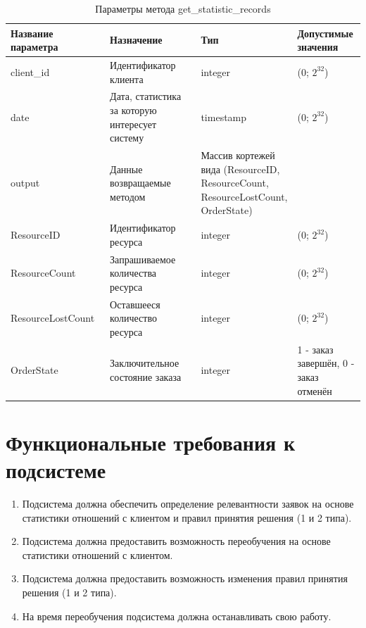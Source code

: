 \documentclass[utf8x, 12pt]{G7-32}
\begin{document}
\begin{table}[ht!]
        \caption{Параметры метода get_statistic_records}
        \begin{center}
                \begin{tabular}{|p{0.3\linewidth}|p{0.3\linewidth}|p{0.2\linewidth}|p{0.2\linewidth}|}
                        \hline
                        \textbf{Название параметра} & \textbf{Назначение} &\textbf{Тип} & \textbf{Допустимые значения}\\
                        \hline
                        client_id & Идентификатор клиента & integer & (0; $2^{32}$) \\
                        \hline   
                        date & Дата, статистика за которую интересует систему & timestamp & (0; $2^{32}$) \\
                        \hline   
                        output & Данные возвращаемые методом & Массив кортежей вида (ResourceID, ResourceCount, ResourceLostCount, OrderState)&  \\
                        \hline   
                        ResourceID & Идентификатор ресурса & integer & (0; $2^{32}$) \\
                        \hline
                        ResourceCount & Запрашиваемое количества ресурса & integer & (0; $2^{32}$) \\
                        \hline
                        ResourceLostCount & Оставшееся количество ресурса & integer & (0; $2^{32}$)\\
                        \hline
                        OrderState & Заключительное состояние заказа & integer & 1 - заказ завершён, 0 - заказ отменён \\
                        \hline   
               \end{tabular}        
               \label{tabl:input3}
        \end{center}
\end{table}

\section{Функциональные требования к подсистеме}

\begin{enumerate}
	\item Подсистема должна обеспечить определение релевантности заявок на основе
        статистики отношений с клиентом и правил принятия решения (1 и 2 типа).
        \item Подсистема должна предоставить возможность переобучения на основе 
        статистики отношений с клиентом.
        \item Подсистема должна предоставить возможность изменения правил принятия 
        решения (1 и 2 типа).
        \item На время переобучения подсистема должна останавливать свою работу.
\end{enumerate}
\end{document}
